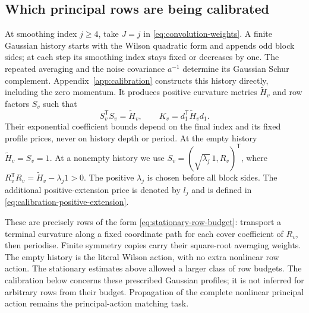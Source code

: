 \documentclass[11pt,reqno]{amsart}
\numberwithin{equation}{section}
\theoremstyle{definition}
\theoremstyle{remark}
\begin{document}
\subsection{Which principal rows are being calibrated}

At smoothing index \(j\ge4\), take \(J=j\) in
\eqref{eq:convolution-weights}. A finite Gaussian history starts
with the Wilson quadratic form and appends odd block sides;
at each step its smoothing index stays fixed or decreases by
one. The repeated averaging and the noise covariance \(a^{-1}\)
determine its Gaussian Schur complement. Appendix~\ref{app:calibration}
constructs this history directly, including the zero momentum.
It produces positive curvature metrics \(\widetilde H_v\) and
row factors \(S_v\) such that
\begin{equation}
 S_v^{\mathsf T}S_v=\widetilde H_v,\qquad
 K_v=d_1^{\mathsf T}\widetilde H_vd_1.
 \label{eq:calibrated-row-metric}
\end{equation}
Their exponential coefficient bounds depend on the final index
and its fixed profile prices, never on history depth or period.
At the empty history \(\widetilde H_v=S_v=1\).
At a nonempty history we use
\(S_v=(\sqrt{\lambda_j}\,1,R_v)^{\mathsf T}\), where
\(R_v^{\mathsf T}R_v=\widetilde H_v-\lambda_j1>0\).
The positive \(\lambda_j\) is chosen before all block sides.
The additional positive-extension price is denoted by \(l_j\)
and is defined in \eqref{eq:calibration-positive-extension}.

These are precisely rows of the form
\eqref{eq:stationary-row-budget}: transport a terminal curvature
along a fixed coordinate path for each cover coefficient of
\(R_v\), then periodise. Finite symmetry copies carry their
square-root averaging weights. The empty history is the literal
Wilson action, with no extra nonlinear row action.
The stationary estimates above allowed a larger class of row
budgets. The calibration below concerns these prescribed Gaussian
profiles; it is not inferred for arbitrary rows from their budget.
Propagation of the complete nonlinear principal action remains
the principal-action matching task.
\end{document}
